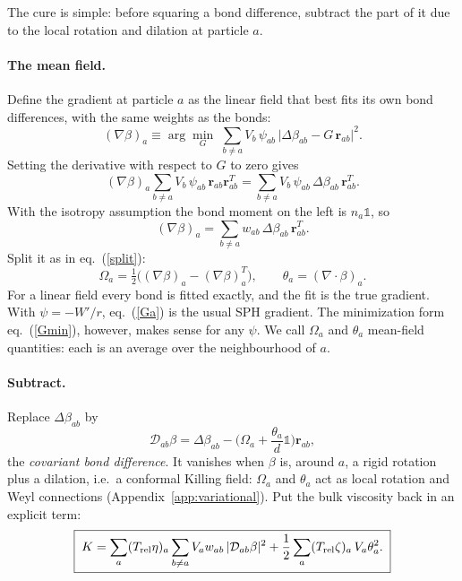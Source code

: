 \documentclass[11pt,aps,preprint,nofootinbib,superscriptaddress,tightenlines]{revtex4-2}
\def\st{\begin{equation}}
\def\stp{\end{equation}}
\def\Eq#1{eq.~(\ref{#1})}
\newcommand{\one}{\mathds{1}}
\let\oldparagraph\paragraph
\renewcommand{\paragraph}{\par\bigskip\oldparagraph}
\begin{document}
The cure is simple: before squaring a bond difference, subtract the part of it
due to the local rotation and dilation at particle $a$.

\paragraph{The mean field.}  Define the gradient at particle $a$ as the linear
field that best fits its own bond differences, with the same weights as the
bonds:
\st
(\nabla\beta)_a\equiv\arg\min_{G}\;\sum_{b\neq a}V_b\,\psi_{ab}\,\big|\Delta\beta_{ab}-G\,\bm r_{ab}\big|^2 .
\label{Gmin}
\stp
Setting the derivative with respect to $G$ to zero gives
\st
(\nabla\beta)_a\sum_{b\neq a}V_b\,\psi_{ab}\,\bm r_{ab}\bm r_{ab}^T
=\sum_{b\neq a}V_b\,\psi_{ab}\,\Delta\beta_{ab}\,\bm r_{ab}^T .
\stp
With the isotropy assumption the bond moment on the left is $n_a\one$, so
\st
(\nabla\beta)_a=\sum_{b\neq a}w_{ab}\,\Delta\beta_{ab}\,\bm r_{ab}^T .
\label{Ga}
\stp
Split it as in \Eq{split}:
\st
\Omega_a=\tfrac12\big((\nabla\beta)_a-(\nabla\beta)_a^T\big),\qquad \theta_a=(\nabla\!\cdot\!\beta)_a .
\label{Omegaa}
\stp
For a linear field every bond is fitted exactly, and the fit is the true
gradient.  With $\psi=-W'/r$, \Eq{Ga} is the usual SPH gradient.  The minimization form \Eq{Gmin}, however, makes
sense for any $\psi$.
We call $\Omega_a$ and $\theta_a$ mean-field quantities: each is an average over
the neighbourhood of $a$.

\paragraph{Subtract.}  Replace $\Delta\beta_{ab}$ by
\st
\mathcal D_{ab}\beta=\Delta\beta_{ab}-\Big(\Omega_a+\frac{\theta_a}{d}\one\Big)\bm r_{ab},
\label{Dab}
\stp
the \emph{covariant bond difference}.  It vanishes when $\beta$ is, around $a$,
a rigid rotation plus a dilation, i.e.\ a conformal Killing field: $\Omega_a$
and $\theta_a$ act as local rotation and Weyl connections
(Appendix~\ref{app:variational}).  Put the bulk viscosity back in an explicit term:
\st
\boxed{\;K=\sum_a(T_{\rm rel}\eta)_a\sum_{b\neq a}V_aw_{ab}\,
|\mathcal D_{ab}\beta|^2+\frac12\sum_a(T_{\rm rel}\zeta)_a\,V_a\theta_a^2 .\;}
\label{KMF}
\stp
\end{document}
